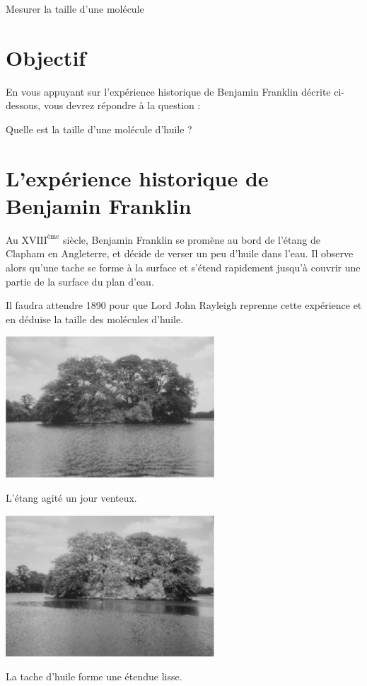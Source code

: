 \documentclass[12pt,a4paper]{article}
\begin{document}
\begin{header}
Mesurer la taille d'une molécule
\end{header}

\section*{Objectif}

En vous appuyant sur l'expérience historique de Benjamin Franklin décrite ci-dessous, vous devrez répondre à la question :

\begin{objectif}
Quelle est la taille d'une molécule d'huile ?
\end{objectif}

\section*{L'expérience historique de Benjamin Franklin}

Au $\text{XVIII}^\text{ème}$ siècle, Benjamin Franklin se promène au bord de l'étang de Clapham en Angleterre, et décide de verser un peu d'huile dans l'eau. Il observe alors qu'une tache se forme à la surface et s'étend rapidement jusqu'à couvrir une partie de la surface du plan d'eau.

Il faudra attendre 1890 pour que Lord John Rayleigh reprenne cette expérience et en déduise la taille des molécules d'huile.

\begin{multicols}{2}
\center
\includegraphics[height=150pt]{images/franklin_lake.png}

L'étang agité un jour venteux.

\includegraphics[height=150pt]{images/franklin_lake_oiled.png}

La tache d'huile forme une étendue lisse.
\end{multicols}
\end{document}
